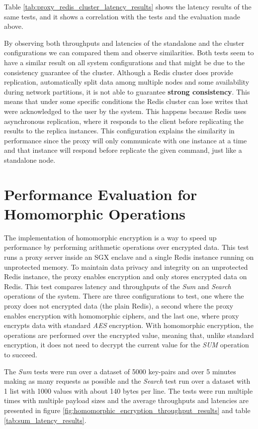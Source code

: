 Table \ref{tab:proxy_redis_cluster_latency_results} shows the latency results of the same tests, and it shows a correlation with the tests and the evaluation made above.

By observing both throughputs and latencies of the standalone and the cluster configurations we can compared them and observe similarities. Both tests seem to have a similar result on all system configurations and that might be due to the consistency guarantee of the cluster. Although a Redis cluster does provide replication, automatically split data among multiple nodes and some availability during network partitions, it is not able to guarantee \textbf{strong consistency}. This means that under some specific conditions the Redis cluster can lose writes that were acknowledged to the user by the system. This happens because Redis uses asynchronous replication, where it responds to the client before replicating the results to the replica instances. This configuration explains the similarity in performance since the proxy will only communicate with one instance at a time and that instance will respond before replicate the given command, just like a standalone node.

\section{Performance Evaluation for Homomorphic Operations}
\label{sec:performance_evaluation_homomorphic_operations}

The implementation of homomorphic encryption is a way to speed up performance by performing arithmetic operations over encrypted data. This test runs a proxy server inside an \gls{SGX} enclave and a single Redis instance running on unprotected memory. To maintain data privacy and integrity on an unprotected Redis instance, the proxy enables encryption and only stores encrypted data on Redis. This test compares latency and throughputs of the \textit{Sum} and \textit{Search} operations of the system. There are three configurations to test, one where the proxy does not encrypted data (the plain Redis), a second where the proxy enables encryption with homomorphic ciphers, and the last one, where proxy encrypts data with standard \textit{AES} encryption. With homomorphic encryption, the operations are performed over the encrypted value, meaning that, unlike standard encryption, it does not need to decrypt the current value for the \textit{SUM} operation to succeed.

The \textit{Sum} tests were run over a dataset of 5000 key-pairs and over 5 minutes making as many requests as possible and the \textit{Search} test run over a dataset with 1 list with 1000 values with about 140 bytes per line. The tests were run multiple times with multiple payload sizes and the average throughputs and latencies are presented in figure \ref{fig:homomorphic_encryption_throughput_results} and table \ref{tab:sum_latency_results}.


